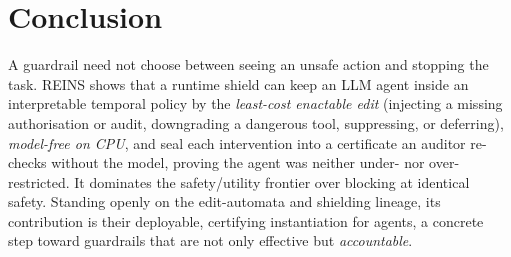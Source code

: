 \documentclass[11pt]{article}
\begin{document}
\section{Conclusion}
A guardrail need not choose between seeing an unsafe action and stopping the task.
REINS shows that a runtime shield can keep an LLM agent inside an interpretable
temporal policy by the \emph{least-cost enactable edit} (injecting a missing
authorisation or audit, downgrading a dangerous tool, suppressing, or deferring),
\emph{model-free on CPU}, and seal each intervention into a certificate an auditor
re-checks without the model, proving the agent was neither under- nor
over-restricted. It dominates the safety/utility frontier over blocking at
identical safety. Standing openly on the edit-automata and shielding lineage, its
contribution is their deployable, certifying instantiation for agents, a concrete
step toward guardrails that are not only effective but \emph{accountable}.


\end{document}
